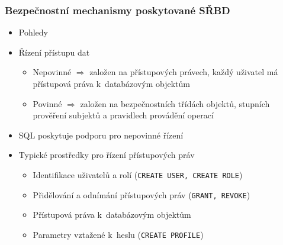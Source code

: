 \documentclass[a4paper,10pt]{article}
\newcommand{\tedy}{$\Rightarrow$ }
\begin{document}
      \subsubsection{Bezpečnostní mechanismy poskytované SŘBD}
        \begin{itemize}
          \item Pohledy
          \item Řízení přístupu dat
          \begin{itemize}
            \item Nepovinné \tedy založen na přístupových právech, každý uživatel má přístupová práva k~databázovým objektům
            \item Povinné \tedy založen na bezpečnostních třídách objektů, stupních prověření subjektů a pravidlech provádění operací
          \end{itemize}
          \item SQL poskytuje podporu pro nepovinné řízení
          \item Typické prostředky pro řízení přístupových práv
          \begin{itemize}
            \item Identifikace uživatelů a rolí (\texttt{CREATE USER, CREATE ROLE})
            \item Přidělování a odnímání přístupových práv (\texttt{GRANT, REVOKE})
            \item Přístupová práva k~databázovým objektům
            \item Parametry vztažené k~heslu (\texttt{CREATE PROFILE})
          \end{itemize}
        \end{itemize}

\end{document}

